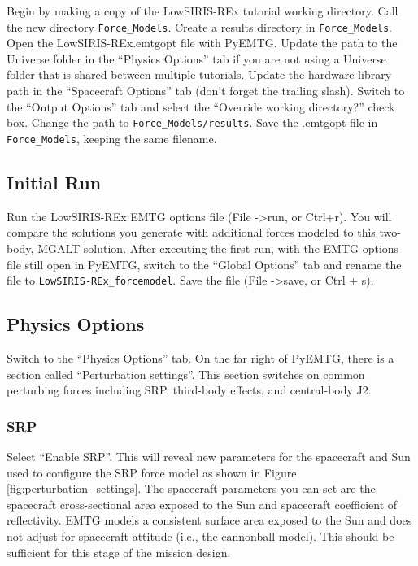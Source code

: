 \documentclass[11pt]{article}
\begin{document}
Begin by making a copy of the LowSIRIS-REx tutorial working directory. Call the new directory \texttt{Force\_Models}. Create a results directory in \texttt{Force\_Models}. Open the LowSIRIS-REx.emtgopt file with PyEMTG. Update the path to the Universe folder in the ``Physics Options'' tab if you are not using a Universe folder that is shared between multiple tutorials. Update the hardware library path in the ``Spacecraft Options'' tab (don’t forget the trailing slash). Switch to the ``Output Options'' tab and select the ``Override working directory?'' check box. Change the path to \texttt{Force\_Models/results}. Save the .emtgopt file in \texttt{Force\_Models}, keeping the same filename.

\subsection{Initial Run}
\label{sec:initial_run}

Run the LowSIRIS-REx \ac{EMTG} options file (File -\textgreater run, or Ctrl+r). You will compare the solutions you generate with additional forces modeled to this two-body, \ac{MGALT} solution. After executing the first run, with the \ac{EMTG} options file still open in PyEMTG, switch to the ``Global Options'' tab and rename the file to \texttt{LowSIRIS-REx\_forcemodel}. Save the file (File -\textgreater save, or Ctrl + s).

\subsection{Physics Options}
\label{sec:physics_options}

Switch to the ``Physics Options'' tab. On the far right of PyEMTG, there is a section called ``Perturbation settings''. This section switches on common perturbing forces including \ac{SRP}, third-body effects, and central-body J2. 

\subsubsection{SRP}
\label{sec:srp}

Select ``Enable SRP''. This will reveal new parameters for the spacecraft and Sun used to configure the \ac{SRP} force model as shown in Figure \ref{fig:perturbation_settings}. The spacecraft parameters you can set are the spacecraft cross-sectional area exposed to the Sun and spacecraft coefficient of reflectivity. \ac{EMTG} models a consistent surface area exposed to the Sun and does not adjust for spacecraft attitude (i.e., the cannonball model). This should be sufficient for this stage of the mission design.
\end{document}

